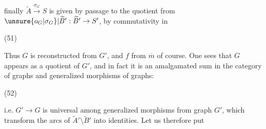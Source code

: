 finally $\widetilde A\xrightarrow{\sigma_G}S$ is given by passage to the quotient from $\unsure{o_G|\sigma_G}|\widetilde B':\widetilde B'\to S'$, by commutativity in

(51)\quad{}

Thus $G$ is reconstructed from $G'$, and $f$ from $\overline m$ of course. One sees that $G$ appears as a quotient of $G'$, and in fact it is  an amalgamated sum in the category of graphs and generalized morphisms of graphs:

(52)\quad{}

i.e. $G'\longrightarrow G$ is universal among generalized morphisms from  graph $G'$, which transform the arcs of $\widetilde A'\setminus\widetilde B'$ into identities. Let us therefore put
